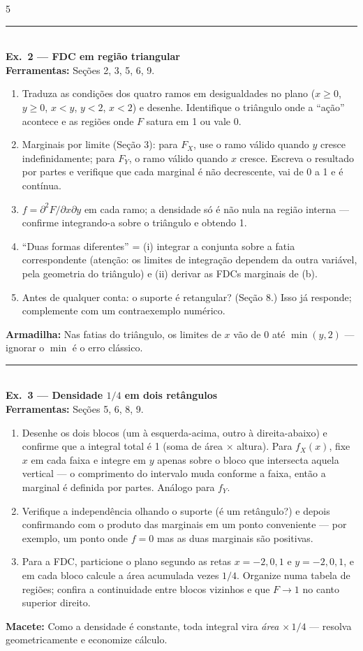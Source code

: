 \documentclass[a4paper,8pt]{extarticle}
\newcommand{\tit}[1]{\vspace{2pt}\textcolor{azul}{\rule{\linewidth}{0.6pt}}\\[1pt]\textbf{\textcolor{azul}{#1}}\\[1pt]}
\newcommand{\mac}[1]{\textcolor{verde}{\textbf{Macete:}} #1\par}
\newcommand{\arm}[1]{\textcolor{vinho}{\textbf{Armadilha:}} #1\par}
\newcommand{\ferr}[1]{\textbf{Ferramentas:} #1\par}
\begin{document}
\begin{multicols*}{5}
\tit{Ex.\ 2 — FDC em região triangular}
\ferr{Seções 2, 3, 5, 6, 9.}
\begin{enumerate}
\item[(a)] Traduza as condições dos quatro ramos em desigualdades no plano ($x\ge0$, $y\ge0$, $x<y$, $y<2$, $x<2$) e desenhe. Identifique o triângulo onde a “ação” acontece e as regiões onde $F$ satura em 1 ou vale 0.
\item[(b)] Marginais por limite (Seção 3): para $F_X$, use o ramo válido quando $y$ cresce indefinidamente; para $F_Y$, o ramo válido quando $x$ cresce. Escreva o resultado por partes e verifique que cada marginal é não decrescente, vai de 0 a 1 e é contínua.
\item[(c)] $f=\partial^2F/\partial x\partial y$ em cada ramo; a densidade só é não nula na região interna — confirme integrando-a sobre o triângulo e obtendo 1.
\item[(d)] “Duas formas diferentes” = (i) integrar a conjunta sobre a fatia correspondente (atenção: os limites de integração dependem da outra variável, pela geometria do triângulo) e (ii) derivar as FDCs marginais de (b).
\item[(e)] Antes de qualquer conta: o suporte é retangular? (Seção 8.) Isso já responde; complemente com um contraexemplo numérico.
\end{enumerate}
\arm{Nas fatias do triângulo, os limites de $x$ vão de 0 até $\min(y,2)$ — ignorar o $\min$ é o erro clássico.}

\tit{Ex.\ 3 — Densidade $1/4$ em dois retângulos}
\ferr{Seções 5, 6, 8, 9.}
\begin{enumerate}
\item[(a)] Desenhe os dois blocos (um à esquerda-acima, outro à direita-abaixo) e confirme que a integral total é 1 (soma de área $\times$ altura). Para $f_X(x)$, fixe $x$ em cada faixa e integre em $y$ apenas sobre o bloco que intersecta aquela vertical — o comprimento do intervalo muda conforme a faixa, então a marginal é definida por partes. Análogo para $f_Y$.
\item[(b)] Verifique a independência olhando o suporte (é um retângulo?) e depois confirmando com o produto das marginais em um ponto conveniente — por exemplo, um ponto onde $f=0$ mas as duas marginais são positivas.
\item[(c)] Para a FDC, particione o plano segundo as retas $x=-2,0,1$ e $y=-2,0,1$, e em cada bloco calcule a área acumulada vezes $1/4$. Organize numa tabela de regiões; confira a continuidade entre blocos vizinhos e que $F\to1$ no canto superior direito.
\end{enumerate}
\mac{Como a densidade é constante, toda integral vira \emph{área} $\times\,1/4$ — resolva geometricamente e economize cálculo.}


\end{multicols*}
\end{document}
